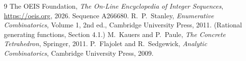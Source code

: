 \documentclass[11pt,a4paper]{article}
\theoremstyle{plain}
\theoremstyle{definition}
\begin{document}
\begin{thebibliography}{9}
 The OEIS Foundation, \emph{The On-Line Encyclopedia of Integer
Sequences}, \url{https://oeis.org}, 2026. Sequence A266680.
 R.~P.~Stanley, \emph{Enumerative Combinatorics}, Volume 1, 2nd ed.,
Cambridge University Press, 2011. (Rational generating functions, Section 4.1.)
 M.~Kauers and P.~Paule, \emph{The Concrete Tetrahedron}, Springer, 2011.
 P.~Flajolet and R.~Sedgewick, \emph{Analytic Combinatorics}, Cambridge
University Press, 2009.
\end{thebibliography}
\end{document}
